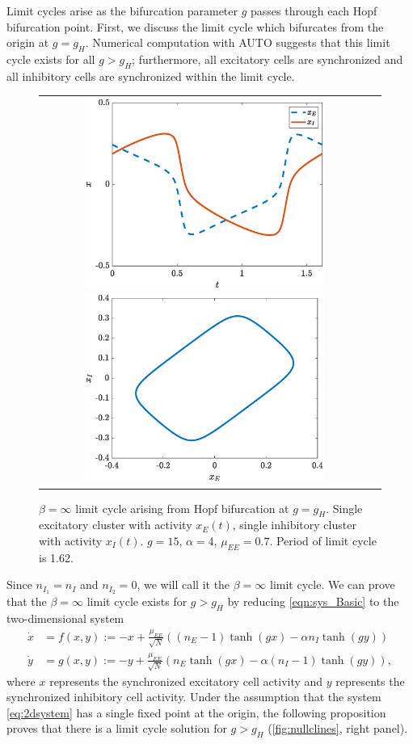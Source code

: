 \documentclass[reqno]{siamonline190516}
\begin{document}
Limit cycles arise as the bifurcation parameter $g$ passes through each Hopf bifurcation point. First, we discuss the limit cycle which bifurcates from the origin at $g = g_H$. Numerical computation with AUTO suggests that this limit cycle exists for all $g > g_H$; furthermore, all excitatory cells are synchronized and all inhibitory cells are synchronized within the limit cycle.
\begin{figure}
    \centering
    \begin{tabular}{cc}
    \includegraphics[width=7.85cm]{images/limitcycle1.eps}
    \includegraphics[width=7.85cm]{images/limitcycle2.eps}
    \end{tabular}
    \caption{$\beta = \infty$ limit cycle arising from Hopf bifurcation at $g = g_H$. Single excitatory cluster with activity $x_E(t)$, single inhibitory cluster with activity $x_I(t)$. $g = 15$, $\alpha = 4$, $\mu_{EE}= 0.7$. Period of limit cycle is 1.62.} 
    \label{fig:limitcycleorigin}
\end{figure}
Since $n_{I_1} = n_I$ and $n_{I_2} = 0$, we will call it the $\beta=\infty$ limit cycle. We can prove that the $\beta = \infty$ limit cycle exists for $g > g_H$ by reducing \cref{eqn:sys_Basic} to the two-dimensional system
\begin{equation}\label{eq:2dsystem}
\begin{aligned}
\dot{x} &= f(x, y) := -x + \frac{\mu_{EE}}{\sqrt{N}}\left((n_E - 1) \tanh(g x) - \alpha n_I \tanh(g y) \right) \\
\dot{y} &= g(x, y) := -y + \frac{\mu_{EE}}{\sqrt{N}}\left( n_E \tanh(g x) - \alpha (n_I - 1) \tanh(g y) \right), 
\end{aligned}
\end{equation}
where $x$ represents the synchronized excitatory cell activity and $y$ represents the synchronized inhibitory cell activity. Under the assumption that the system \cref{eq:2dsystem} has a single fixed point at the origin, the following proposition proves that there is a limit cycle solution for $g > g_H$ (\cref{fig:nullclines}, right panel).
\end{document}
